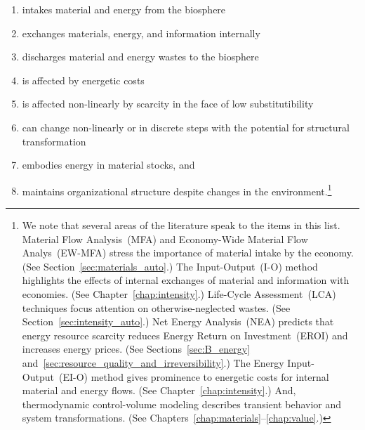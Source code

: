 \begin{enumerate}
	\item{\label{itm:intake}intakes material and energy from the biosphere}
	\item{\label{itm:internal_exchange}exchanges materials, energy, and information internally}
	\item{\label{itm:discharge}discharges material and energy wastes to the biosphere}
	\item{\label{itm:energetic_costs}is affected by energetic costs}
	\item{\label{itm:scarcity}is affected non-linearly by scarcity 
			in the face of low substitutibility}
	\item{\label{itm:non-linear}can change non-linearly or in discrete steps with the potential 
			for structural transformation}
	\item{\label{itm:embodies}embodies energy in material stocks, and}
	\item{\label{itm:robust}maintains organizational structure despite changes 
			in the environment.\footnote{We note that 
				several areas of the literature speak to the items in this list.
				Material Flow Analysis~(MFA) and 
				Economy-Wide Material Flow Analys~(EW-MFA)
				stress the importance of
				material intake by the economy. 
				(See Section~\ref{sec:materials_auto}.)
				The Input-Output~(I-O) method highlights the effects of internal exchanges
				of material and information with economies. 
				(See Chapter~\ref{chap:intensity}.)
				Life-Cycle Assessment~(LCA) techniques focus attention 
				on otherwise-neglected wastes. 
				(See Section~\ref{sec:intensity_auto}.)
				Net Energy Analysis~(NEA) predicts that energy resource 
				scarcity reduces Energy Return on Investment~(EROI)
				and increases energy prices.
				(See Sections~\ref{sec:B_energy} 
				and~\ref{sec:resource_quality_and_irreversibility}.)
				The Energy Input-Output~(EI-O) method gives prominence to energetic costs
				for internal material and energy flows.
				(See Chapter~\ref{chap:intensity}.)
				And, thermodynamic control-volume modeling describes
				transient behavior and system transformations.
				(See Chapters~\ref{chap:materials}--\ref{chap:value}.)
			}}
\end{enumerate}

